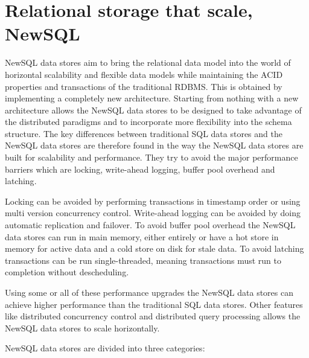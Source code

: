 
\section{Relational storage that scale, NewSQL}
\label{sec:newsql}
NewSQL data stores aim to bring the relational data model into the world of horizontal scalability and flexible data models while maintaining the ACID properties and transactions of the traditional RDBMS\cite{Cattell:ScalableSQLAndNoSQLDataStores}.
This is obtained by implementing a completely new architecture\cite{CORBETT:SpannerGooglesGloballyDistributedDatabase}.
Starting from nothing with a new architecture allows the NewSQL data stores to be designed to take advantage of the distributed paradigms and to incorporate more flexibility into the schema structure.
The key differences between traditional SQL data stores and the NewSQL data stores are therefore found in the way the NewSQL data stores are built for scalability and performance.
They try to avoid the major performance barriers which are locking, write-ahead logging, buffer pool overhead and latching\cite{Stonebraker:NewSQLvsNoSQLForNewOLTP}.

Locking can be avoided by performing transactions in timestamp order or using multi version concurrency control.
Write-ahead logging can be avoided by doing automatic replication and failover.
To avoid buffer pool overhead the NewSQL data stores can run in main memory, either entirely or have a hot store in memory for active data and a cold store on disk for stale data.
To avoid latching transactions can be run single-threaded, meaning transactions must run to completion without descheduling.

Using some or all of these performance upgrades the NewSQL data stores can achieve higher performance than the traditional SQL data stores.
Other features like distributed concurrency control and distributed query processing allows the NewSQL data stores to scale horizontally.

NewSQL data stores are divided into three categories\cite{Prasanns:NewSQLTheNewWayToHandleBigData}:

